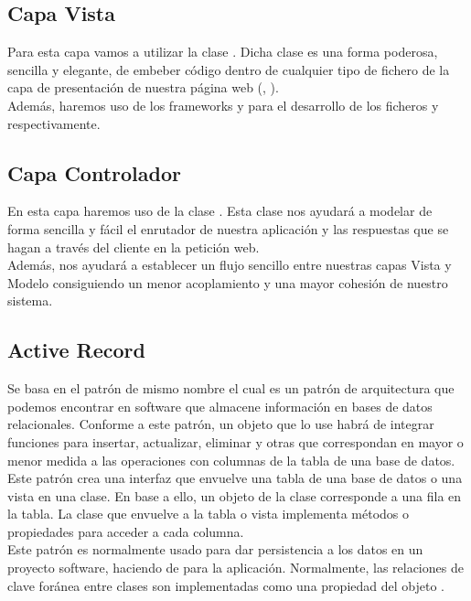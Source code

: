 \subsection{Capa Vista}

Para esta capa vamos a utilizar la clase . Dicha clase es
una forma poderosa, sencilla y elegante, de embeber código  dentro
de cualquier tipo de fichero de la capa de presentación de nuestra página web
(, ).\\

Además, haremos uso de los frameworks 
\cite{lang:coffescript} y  \cite{lang:sass} para el desarrollo de
los ficheros  y  respectivamente.

\subsection{Capa Controlador}
En esta capa haremos uso de la clase . Esta clase
nos ayudará a modelar de forma sencilla y fácil el enrutador de nuestra
aplicación y las respuestas que se hagan a través del cliente en la petición
web.\\

Además, nos ayudará a establecer un flujo sencillo entre nuestras capas Vista y
Modelo consiguiendo un menor acoplamiento y una mayor cohesión de nuestro
sistema.

\subsection{Active Record}
Se basa en el patrón de mismo nombre el cual es un patrón de arquitectura que
podemos encontrar en software que almacene información en bases de datos
relacionales. Conforme a este patrón, un objeto que lo use habrá de integrar
funciones para insertar, actualizar, eliminar y otras que correspondan en mayor
o menor medida a las operaciones con columnas de la tabla de una base de datos.\\

Este patrón crea una interfaz que envuelve una tabla de una base de datos o una
vista en una clase. En base a ello, un objeto de la clase corresponde a una fila
en la tabla. La clase que envuelve a la tabla o vista implementa métodos o
propiedades para acceder a cada columna.\\

Este patrón es normalmente usado para dar persistencia a los datos en un
proyecto software, haciendo de  para la aplicación. Normalmente,
las relaciones de clave foránea entre clases son implementadas como una
propiedad del objeto \cite{pattern:activerecord}.\\

